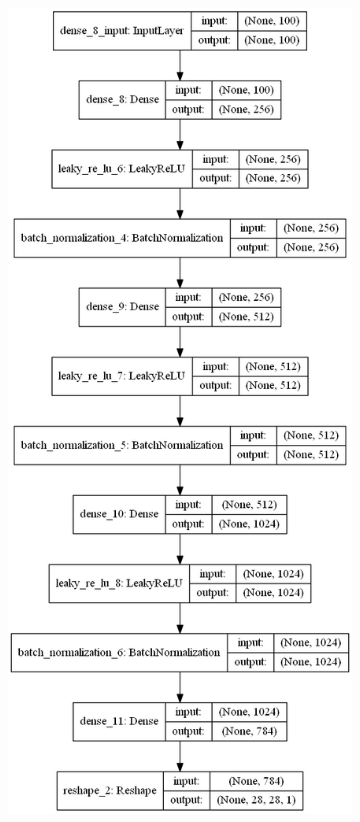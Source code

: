 \documentclass[conference]{IEEEtran}
\begin{document}
\begin{figure}
     \centering
     \begin{subfigure}[b]{\columnwidth}
         \centering
         \includegraphics[width=\linewidth]{generator_gan.png}

\end{subfigure}
\end{figure}
\end{document}
